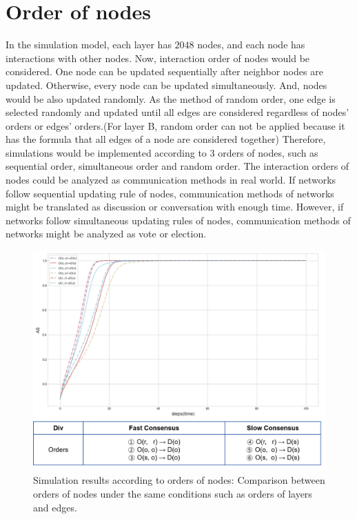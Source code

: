 \section{Order of nodes}
In the simulation model, each layer has $2048$ nodes, and each node has interactions with other nodes. Now, interaction order of nodes would be considered. One node can be updated sequentially after neighbor nodes are updated. Otherwise, every node can be updated simultaneously. And, nodes would be also updated randomly. As the method of random order, one edge is selected randomly and updated until all edges are considered regardless of nodes' orders or edges' orders.(For layer B, random order can not be applied because it has the formula that all edges of a node are considered together) Therefore, simulations would be implemented according to $3$ orders of nodes, such as sequential order, simultaneous order and random order. The interaction orders of nodes could be analyzed as communication methods in real world. If networks follow sequential updating rule of nodes, communication methods of networks might be translated as discussion or conversation with enough time. However, if networks follow simultaneous updating rules of nodes, communication methods of networks might be analyzed as vote or election.\\ 

\begin{figure}[!htb]
	\centering
	\includegraphics[width=\hsize]{figure/chap4_nodeorder.png}
	\caption{Simulation results according to orders of nodes: Comparison between orders of nodes under the same conditions such as orders of layers and edges.}
	\label{chap4_nodeorder}
\end{figure}

